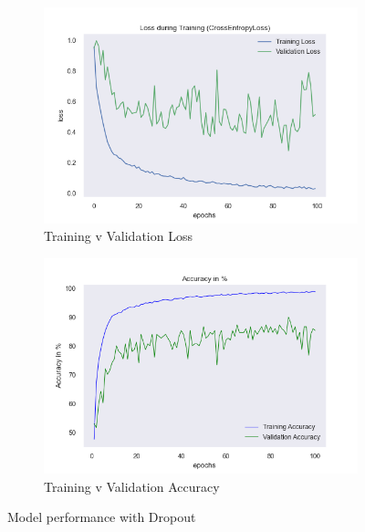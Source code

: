 \documentclass[a4paper]{article}
\begin{document}
\begin{figure}[H]
\centering
\begin{subfigure}{0.5\textwidth}
  \centering
  \includegraphics[width=1\linewidth]{img/baptiste/baptiste_100epoches_val_loss__Dropouts_True__BatchNorm_False.png}
  \caption{Training v Validation Loss}
  \label{fig:sub1}
\end{subfigure}%
\begin{subfigure}{0.5\textwidth}
  \centering
  \includegraphics[width=1\linewidth]{img/baptiste/baptiste_100epoches_train_accuracy__Dropouts_True__BatchNorm_False.png}
  \caption{Training v Validation Accuracy}
  \label{fig:sub2}
\end{subfigure}
\caption{Model performance with Dropout}
\label{fig:test}
\end{figure}
\end{document}
